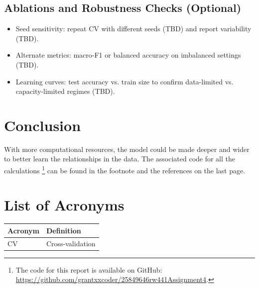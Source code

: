 \documentclass[conference]{IEEEtran}
\begin{document}
\subsection{Ablations and Robustness Checks (Optional)}
\label{sec:results-robustness}
\begin{itemize}
  \item Seed sensitivity: repeat CV with different seeds (TBD) and report variability (TBD).
  \item Alternate metrics: macro-F1 or balanced accuracy on imbalanced settings (TBD).
  \item Learning curves: test accuracy vs. train size to confirm data-limited vs. capacity-limited regimes (TBD).
\end{itemize}


\section{Conclusion}
 With more computational resources, the model could be made deeper and wider to better learn the relationships in the data.
 The associated code for all the calculations
\footnote{The code for this report is available on GitHub: \url{https://github.com/grantxxcoder/25849646rw441Assignment4}.} can be found in the footnote and the references on the last page.
\appendix

\section*{List of Acronyms}
\begingroup
\setlength{\tabcolsep}{6pt}
\renewcommand{\arraystretch}{1.05}
\noindent\begin{tabular}{@{}p{}p{}@{}}
\textbf{Acronym} & \textbf{Definition} \\
\midrule
CV & Cross-validation \\
\end{tabular}
\endgroup



\end{document}
